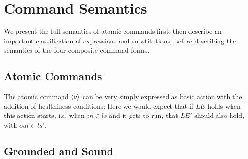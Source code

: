 \section{Command Semantics}\label{sec:semantics}

We present the full semantics of atomic commands first,
then describe an important classification of expressions and substitutions,
before describing the semantics of the four composite command forms.

\subsection{Atomic Commands}\label{ssec:atomic}

The atomic command $\langle a\rangle$ can be very simply expressed as basic action
with the addition of healthiness conditions:
Here we would expect that if $LE$ holds when this action starts,
i.e. when $in \in ls$ and it gets to run,
that $LE'$ should also hold, with $out \in ls'$.

\subsection{Grounded and Sound}

